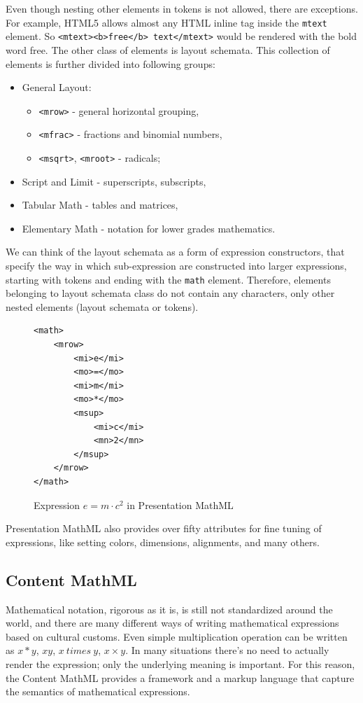 \documentclass[11pt,oneside,final]{fithesis2}
\begin{document}
Even though nesting other elements in tokens is not allowed, there are exceptions. For example, HTML5 allows almost any HTML inline tag inside the \texttt{mtext} element. So \texttt{<mtext><b>free</b> text</mtext>} would be rendered with the bold word free.
The other class of elements is layout schemata. This collection of elements is further divided into following groups:
\begin{itemize}
\item General Layout:
	\begin{itemize}
	\item \texttt{<mrow>} - general horizontal grouping,
	\item \texttt{<mfrac>} - fractions and binomial numbers,
	\item \texttt{<msqrt>}, \texttt{<mroot>} - radicals;
	\end{itemize}
\item Script and Limit - superscripts, subscripts, 
\item Tabular Math - tables and matrices,
\item Elementary Math - notation for lower grades mathematics.
\end{itemize}
We can think of the layout schemata as a form of expression constructors, that specify the way in which sub-expression are constructed into larger expressions, starting with tokens and ending with the \texttt{math} element. Therefore, elements belonging to layout schemata class do not contain any characters, only other nested elements (layout schemata or tokens). 

\begin{figure}[!ht]
\lstset{language=XML,frame=lines}
\begin{lstlisting}
<math>
	<mrow>
		<mi>e</mi>
		<mo>=</mo>
		<mi>m</mi>
		<mo>*</mo>
		<msup>
			<mi>c</mi>
			<mn>2</mn>
		</msup>
	</mrow>
</math>
\end{lstlisting}
\caption{Expression $e=m \cdot c^2$ in Presentation MathML}
\label{fig:presentationmathml}
\end{figure}

Presentation MathML also provides over fifty attributes for fine tuning of expressions, like setting colors, dimensions, alignments, and many others.

\subsection{Content MathML}
Mathematical notation, rigorous as it is, is still not standardized around the world, and there are many different ways of writing mathematical expressions based on cultural customs. Even simple multiplication operation can be written as $x*y$, $xy$, $x\ times\ y$, $x \times y$. In many situations there's no need to actually render the expression; only the underlying meaning is important. For this reason, the Content MathML provides a framework and a markup language that capture the semantics of mathematical expressions.
\end{document}

